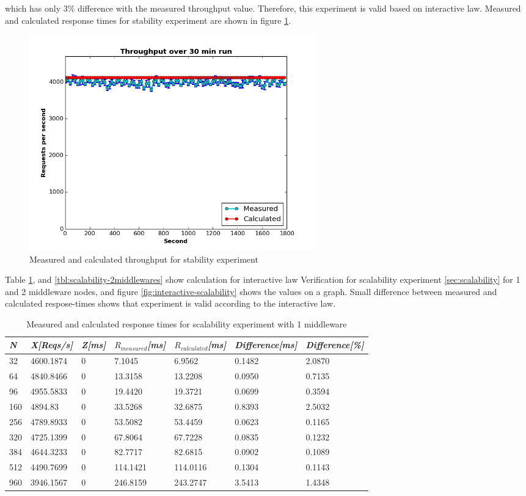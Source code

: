 \documentclass[11pt]{article}
\begin{document}
which has only $3\%$ difference with the measured throughput value. Therefore, this experiment is 
valid based on interactive law. Measured and calculated response times for stability experiment are shown in figure  
\ref{fig:interactive-stability}.

\begin{figure}[H]
  \includegraphics[width=0.6\textwidth,page=1]{figures/interactive_law/stability2}
  \centering
  \caption{Measured and calculated throughput for stability experiment}
  \label{fig:interactive-stability}
\end{figure}



Table \ref{tbl:scalability-1middleware}, and \ref{tbl:scalability-2middlewares} show calculation for 
interactive law Verification for scalability experiment \ref{sec:scalability} for 1 and 2 middleware nodes,
and figure \ref{fig:interactive-scalability} shows the values on a graph. Small difference between measured 
and calculated respose-times shows that experiment is valid according to the interactive law.

\begin{table}[!ht]
  \begin{tabular}{*7l}    \toprule
   \emph{N} & \emph{X[Reqs/s]} & \emph{Z[ms]} & \emph{$R_{measured}$[ms]} & \emph{$R_{calculated}$[ms]} &   \emph{Difference[ms]} & \emph{Difference[\%]} \\\midrule

32 &  4600.1874  & 0 & 7.1045  & 6.9562   & 0.1482 & 2.0870  \\
64 &  4840.8466  & 0 & 13.3158 & 13.2208  & 0.0950 & 0.7135  \\
96 &  4955.5833  & 0 & 19.4420 & 19.3721  & 0.0699 & 0.3594  \\
160&  4894.83    & 0 & 33.5268 & 32.6875  & 0.8393 & 2.5032  \\
256&  4789.8933 & 0 & 53.5082  & 53.4459  & 0.0623 & 0.1165  \\
320 & 4725.1399 & 0 & 67.8064  & 67.7228  & 0.0835 & 0.1232  \\
384 & 4644.3233 & 0 & 82.7717  & 82.6815  & 0.0902 & 0.1089  \\
512 & 4490.7699 & 0 & 114.1421 & 114.0116 & 0.1304 & 0.1143  \\
960 & 3946.1567 & 0 & 246.8159 & 243.2747 & 3.5413 & 1.4348  \\
\hline
  \end{tabular}
  \centering
  \caption{Measured and calculated response times for scalability experiment with 1 middleware}
  \label{tbl:scalability-1middleware}
\end{table} 
\end{document}
